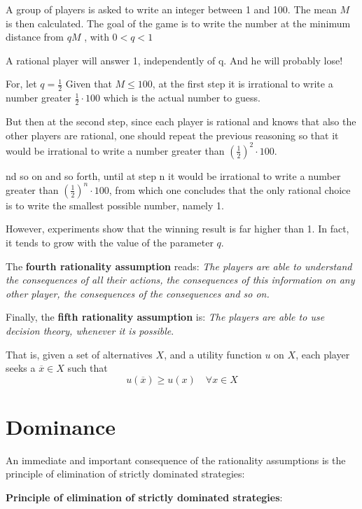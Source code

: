 \documentclass[../main.tex]{subfiles}
\begin{document}
\begin{example}
    A group of players is asked to write an integer between 1 and 100. The mean $M$ is then calculated. The goal of the game is to write the number at the minimum distance from $qM$ , with $0 < q < 1$

    A rational player will answer 1, independently of q. And he will probably lose!

    For, let $q = \frac{1}{2}$ Given that $M \leq 100$, at the first step it is irrational to write a number greater $\frac{1}{2} \cdot 100$ which is the actual number to guess.

    But then at the second step, since each player is rational and knows that also the other players are rational, one should repeat the previous reasoning so that it would be irrational to write a number greater than $\left(\frac{1}{2}\right)^2 \cdot 100$.

    nd so on and so forth, until at step n it would be irrational to write a number greater than $\left(\frac{1}{2}\right)^n \cdot 100$, from which one concludes that the only rational choice is to write the smallest possible number, namely 1.

    However, experiments show that the winning result is far higher than 1. In fact, it tends to grow with the value of the parameter $q$.
\end{example}

The \textbf{fourth rationality assumption} reads: \textit{The players are able to understand the consequences of all their actions, the consequences of this information on any other player, the consequences of the consequences and so on.}

Finally, the \textbf{fifth rationality assumption} is: \textit{The players are able to use decision theory, whenever it is possible}.

That is, given a set of alternatives $X$, and a utility function $u$ on $X$, each player seeks a $\overline{x} \in X$ such that
\[
    u(\overline{x}) \geq u(x) \quad \forall x \in X
\]

\section{Dominance}
An immediate and important consequence of the rationality assumptions is the principle of elimination of strictly dominated strategies:

\textbf{Principle of elimination of strictly dominated strategies}:
\end{document}
